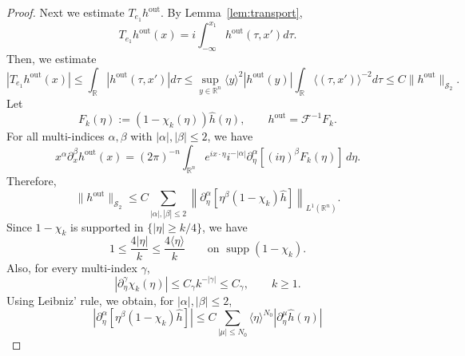 \documentclass[12pt,a4paper]{amsart}
\numberwithin{equation}{section}
\theoremstyle{plain}
\theoremstyle{definition}
\begin{document}
\begin{proof}
Next we estimate $T_{e_1} h^{\mathrm{out}}$.
By Lemma~\ref{lem:transport},
\begin{equation*}
    T_{e_1} h^{\mathrm{out}}(x)
    =
    i \int_{-\infty}^{x_1} h^{\mathrm{out}}(\tau, x') d\tau.
\end{equation*}
Then, we estimate
\begin{equation}\label{T_e1_h_out}
    |T_{e_1}h^{\mathrm{out}}(x)|
    \leq
    \int_{\mathbb R}|h^{\mathrm{out}}(\tau,x')|d\tau 
    \leq
    \sup_{y\in\mathbb R^n}
    \langle y\rangle^2 |h^{\mathrm{out}}(y)|
    \int_{\mathbb R}
    \langle(\tau,x')\rangle^{-2}d\tau 
    \leq
    C\|h^{\mathrm{out}}\|_{\mathscr S_2}.
\end{equation}
Let
\begin{equation*}
    F_k(\eta) := (1-\chi_k(\eta))\widehat h(\eta),
    \qquad
    h^{\mathrm{out}} = \mathcal F^{-1}F_k .
\end{equation*}
For all multi-indices $\alpha,\beta$ with
$|\alpha|,|\beta|\leq 2$, we have
\begin{equation*}
    x^\alpha\partial_x^\beta h^{\mathrm{out}}(x)
    =
    (2\pi)^{-n}
    \int_{\mathbb R^n}
    e^{ix\cdot\eta}
    i^{-|\alpha|}
    \partial_\eta^\alpha\!\left[(i\eta)^\beta F_k(\eta)\right]
    \,d\eta .
\end{equation*}
Therefore,
\begin{equation*}
    \|h^{\mathrm{out}}\|_{\mathscr S_2}
    \leq
    C
    \sum_{|\alpha|,|\beta|\leq 2}
    \left\|
    \partial_\eta^\alpha\!\left[\eta^\beta(1-\chi_k)\widehat h\right]
    \right\|_{L^1(\mathbb R^n)} .
\end{equation*}
Since $1-\chi_k$ is supported in $\{|\eta|\geq k/4\}$, we have
\begin{equation}\label{supp_est}
    1\leq \frac{4|\eta|}{k}
    \leq \frac{4\langle\eta\rangle}{k}
    \qquad
    \text{on } \operatorname{supp}(1-\chi_k).
\end{equation}
Also, for every multi-index $\gamma$,
\begin{equation*}
    |\partial_\eta^\gamma \chi_k(\eta)|
    \leq
    C_\gamma k^{-|\gamma|}
    \leq C_\gamma,
    \qquad k\geq 1.
\end{equation*}
Using Leibniz' rule, we obtain, for $|\alpha|,|\beta|\leq 2$,
\begin{equation*}
    \left|
    \partial_\eta^\alpha\!\left[\eta^\beta(1-\chi_k)\widehat h\right]
    \right|
    \leq
    C
    \sum_{|\mu|\leq N_0}
    \langle\eta\rangle^{N_0}
    \left|\partial_\eta^\mu \widehat h(\eta)\right|
\end{equation*}

\end{proof}
\end{document}
